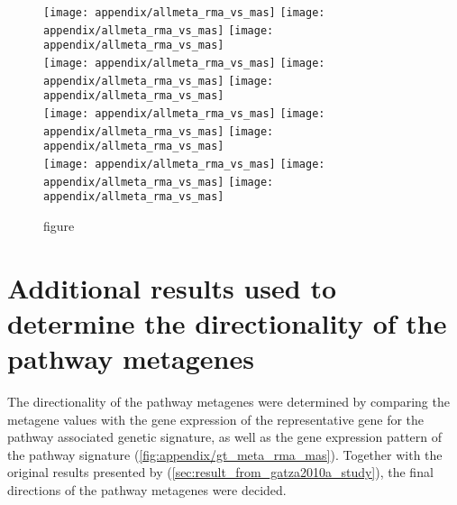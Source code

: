 	\begin{figure}[htpb]
		\ContinuedFloat
		\captionsetup{list=off,format=cont}
		\centering
		\texttt{[image: appendix/allmeta\_rma\_vs\_mas]}
		\texttt{[image: appendix/allmeta\_rma\_vs\_mas]}
		\texttt{[image: appendix/allmeta\_rma\_vs\_mas]}\\
		\texttt{[image: appendix/allmeta\_rma\_vs\_mas]}
		\texttt{[image: appendix/allmeta\_rma\_vs\_mas]}
		\texttt{[image: appendix/allmeta\_rma\_vs\_mas]}\\
		\texttt{[image: appendix/allmeta\_rma\_vs\_mas]}
		\texttt{[image: appendix/allmeta\_rma\_vs\_mas]}
		\texttt{[image: appendix/allmeta\_rma\_vs\_mas]}\\
		\texttt{[image: appendix/allmeta\_rma\_vs\_mas]}
		\texttt{[image: appendix/allmeta\_rma\_vs\_mas]}
		\texttt{[image: appendix/allmeta\_rma\_vs\_mas]}\\
		\caption[]{figure}
	\end{figure}

	\newpage


	\section{Additional results used to determine the directionality of the pathway metagenes}
	\label{sec:additional_results_to_determine_the_directionality_of_the_pathway_metagenes}

	The directionality of the pathway metagenes were determined by comparing the metagene values with the gene expression of the representative gene for the pathway associated genetic signature, as well as the gene expression pattern of the pathway signature (\cref{fig:appendix/gt_meta_rma_mas}).
	Together with the original results presented by \citet{Gatza2010a} (\cref{sec:result_from_gatza2010a_study}), the final directions of the pathway metagenes were decided.

